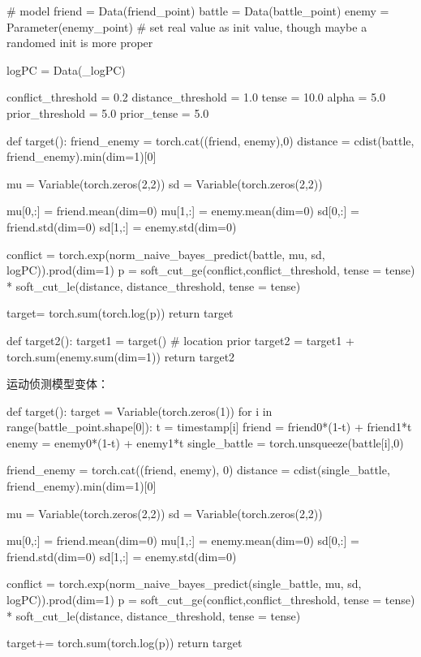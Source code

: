 \documentclass{sicnuthesis}
\begin{document}
\begin{python}

# model
friend = Data(friend_point)
battle = Data(battle_point)
enemy = Parameter(enemy_point) # set real value as init value, though maybe a randomed init is more proper

logPC = Data(_logPC)

conflict_threshold = 0.2
distance_threshold = 1.0
tense = 10.0
alpha = 5.0
prior_threshold = 5.0
prior_tense = 5.0

def target():
    friend_enemy = torch.cat((friend, enemy),0)
    distance = cdist(battle, friend_enemy).min(dim=1)[0]
    

    mu = Variable(torch.zeros(2,2)) 
    sd = Variable(torch.zeros(2,2))
    
    mu[0,:] = friend.mean(dim=0)
    mu[1,:] = enemy.mean(dim=0)
    sd[0,:] = friend.std(dim=0)
    sd[1,:] = enemy.std(dim=0)
    
    conflict = torch.exp(norm_naive_bayes_predict(battle, mu, sd, logPC)).prod(dim=1)
    p = soft_cut_ge(conflict,conflict_threshold, tense = tense) * soft_cut_le(distance, distance_threshold, tense = tense)
    
    target= torch.sum(torch.log(p))
    return target

def target2():
    target1 = target()
    # location prior
    target2 = target1 + torch.sum(enemy.sum(dim=1))
    return target2

\end{python}


运动侦测模型变体：

\begin{python}
def target():
    target = Variable(torch.zeros(1))
    for i in range(battle_point.shape[0]):
        t = timestamp[i]
        friend = friend0*(1-t) + friend1*t
        enemy = enemy0*(1-t) + enemy1*t
        single_battle = torch.unsqueeze(battle[i],0) 
        
        friend_enemy = torch.cat((friend, enemy), 0)
        distance = cdist(single_battle, friend_enemy).min(dim=1)[0]
        
        mu = Variable(torch.zeros(2,2)) 
        sd = Variable(torch.zeros(2,2))

        mu[0,:] = friend.mean(dim=0)
        mu[1,:] = enemy.mean(dim=0)
        sd[0,:] = friend.std(dim=0)
        sd[1,:] = enemy.std(dim=0)

        conflict = torch.exp(norm_naive_bayes_predict(single_battle, mu, sd, logPC)).prod(dim=1)
        p = soft_cut_ge(conflict,conflict_threshold, tense = tense) * soft_cut_le(distance, distance_threshold, tense = tense)

        target+= torch.sum(torch.log(p))
    return target

\end{python}
\end{document}
